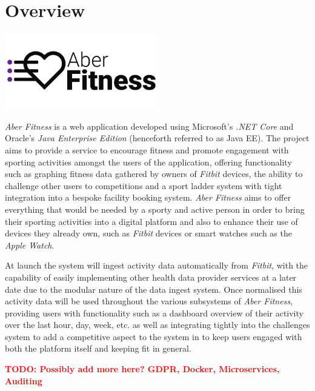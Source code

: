 \chapter{Overview}

\begin{center}
	\includegraphics[width=0.5\textwidth]{Images/aberfitness.png}
\end{center}

\par
\textit{Aber Fitness} is a web application developed using Microsoft's \textit{.NET Core} and Oracle's \textit{Java Enterprise Edition} (henceforth referred to as Java EE). The project aims to provide a service to encourage fitness and promote engagement with sporting activities amongst the users of the application, offering functionality such as graphing fitness data gathered by owners of \textit{Fitbit} devices, the ability to challenge other users to competitions and a sport ladder system with tight integration into a bespoke facility booking system. \textit{Aber Fitness} aims to offer everything that would be needed by a sporty and active person in order to bring their sporting activities into a digital platform and also to enhance their use of devices they already own, such as \textit{Fitbit} devices or smart watches such as the \textit{Apple Watch}.

\par
At launch the system will ingest activity data automatically from \textit{Fitbit}, with the capability of easily implementing other health data provider services at a later date due to the modular nature of the data ingest system. Once normalised this activity data will be used throughout the various subsystems of \textit{Aber Fitness}, providing users with functionality such as a dashboard overview of their activity over the last hour, day, week, etc. as well as integrating tightly into the challenges system to add a competitive aspect to the system in to keep users engaged with both the platform itself and keeping fit in general. 


\textcolor{red}{\textbf{TODO: Possibly add more here? GDPR, Docker, Microservices, Auditing}}